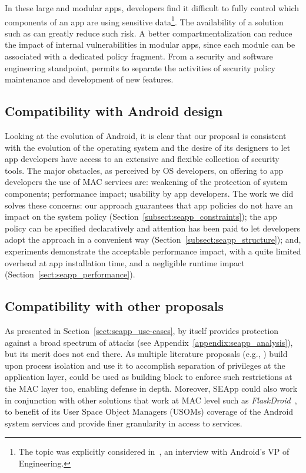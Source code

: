 In these large and modular apps, developers find it difficult to fully
control which components of an app are using sensitive
data\footnote{The topic was explicitly considered
  in~\cite{seapp_burke_interview}, an interview with Android's VP of
  Engineering.}.  The availability of a solution such as \seapp can
greatly reduce such risk.  A better compartmentalization can reduce
the impact of internal vulnerabilities in modular apps, since each
module can be associated with a dedicated policy fragment.  From a
security and software engineering standpoint, \seapp permits to separate
the activities of security policy maintenance and development of new
features.

\subsection{Compatibility with Android design}

Looking at the evolution of Android, it is clear that our proposal is
consistent with the evolution of the operating system and the desire
of its designers to let app developers have access to an extensive and
flexible collection of security tools.  The major obstacles, as
perceived by OS developers, on offering to app developers the use of
MAC services are: weakening of the protection of system components;
performance impact; usability by app developers.  The work we did
solves these concerns: our approach guarantees that app policies do
not have an impact on the system policy
(Section~\ref{subsect:seapp_constraints}); the app policy can be
specified declaratively and attention has been paid to let developers
adopt the approach in a convenient way
(Section~\ref{subsect:seapp_structure}); and, experiments demonstrate
the acceptable performance impact, with a quite limited overhead at
app installation time, and a negligible runtime impact
(Section~\ref{sect:seapp_performance}).

\subsection{Compatibility with other proposals}
As presented in Section~\ref{sect:seapp_use-cases}, \seapp by itself
provides protection against a broad spectrum of attacks (see
Appendix~\ref{appendix:seapp_analysis}), but its merit does not end
there.  As multiple literature proposals (e.g.,
\cite{seapp_10.1145/3133956.3134064, seapp_boxify, seapp_aframe})
build upon process isolation and use it to accomplish separation of
privileges at the application layer, \seapp could be used as building
block to enforce such restrictions at the MAC layer too, enabling
defense in depth. Moreover, SEApp could also work in conjunction with
other solutions that work at MAC level such as {\em
  FlaskDroid}~\cite{seapp_flaskdroid}, to benefit of its User Space
Object Managers (USOMs) coverage of the Android system services and
provide finer granularity in access to services.


